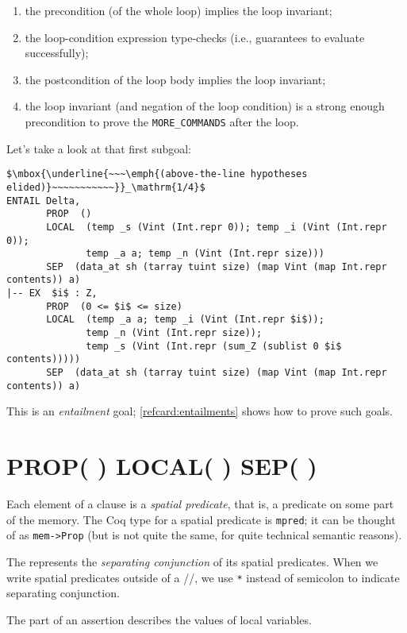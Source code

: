 \documentclass[12pt,fleqn,openany,oneside,showtrims]{memoir}
\begin{document}
\vspace{-\topsep}
\begin{enumerate}
\item the precondition (of the whole loop) implies the loop invariant;
\item the loop-condition expression type-checks (i.e., guarantees to evaluate successfully);
\item the postcondition of the loop body implies the loop invariant;
\item the loop invariant (and negation of the loop condition) is a
  strong enough
  precondition to prove the \lstinline{MORE_COMMANDS} after the loop.
\end{enumerate}
Let's take a look at that first subgoal:
\begin{lstlisting}
$\mbox{\underline{~~~\emph{(above-the-line hypotheses elided)}~~~~~~~~~~~}}_\mathrm{1/4}$
ENTAIL Delta,
       PROP  ()
       LOCAL  (temp _s (Vint (Int.repr 0)); temp _i (Vint (Int.repr 0));
              temp _a a; temp _n (Vint (Int.repr size)))
       SEP  (data_at sh (tarray tuint size) (map Vint (map Int.repr contents)) a)
|-- EX  $i$ : Z,
       PROP  (0 <= $i$ <= size)
       LOCAL  (temp _a a; temp _i (Vint (Int.repr $i$));
              temp _n (Vint (Int.repr size));
              temp _s (Vint (Int.repr (sum_Z (sublist 0 $i$ contents)))))
       SEP  (data_at sh (tarray tuint size) (map Vint (map Int.repr contents)) a)
\end{lstlisting}
This is an \emph{entailment} goal; \autoref{refcard:entailments}
shows how to prove such goals.

\chapter{\upshape PROP( ) LOCAL( ) SEP( )}
\label{refcard:prop-local-sep}
\label{refcard:predicates}

Each element of a \SEP{} clause is a
\emph{spatial predicate}, that is,
a predicate on some part of the memory.
The Coq type for a spatial predicate
is \lstinline{mpred}; it
can be thought of as \lstinline{mem->Prop} (but is not quite
the same, for quite technical semantic reasons).

The \SEP{} represents the \emph{separating conjunction}
of its spatial predicates.
When we write spatial predicates outside of a
\PROP/\LOCAL/\SEP{}, we use \lstinline{*} instead of
semicolon to indicate separating conjunction.

The \LOCAL{} part of an assertion
describes the values
of local variables.
\end{document}
